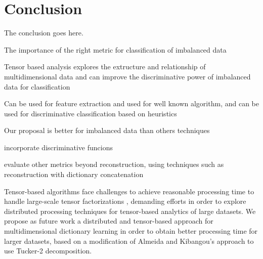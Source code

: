 
\section{Conclusion}
\label{sec:4_conclusion}

The conclusion goes here.

The importance of the right metric for classification of imbalanced data

Tensor based analysis explores the extructure and relationship of multidimensional data and can improve the discriminative power of imbalanced data for classification

Can be used for feature extraction and used for well known algorithm, and can be used for discriminative classification based on heuristics

Our proposal is better for imbalanced data than others techniques

incorporate discriminative funcions

evaluate other metrics beyond reconstruction, using techniques such as reconstruction with dictionary concatenation

Tensor-based algorithms face challenges to achieve reasonable processing time to handle large-scale tensor factorizations \cite{de2014distributed}, demanding efforts in order to explore distributed processing techniques for tensor-based analytics of large datasets. We propose as future work a distributed and tensor-based approach for multidimensional dictionary learning in order to obtain better processing time for larger datasets, based on a modification of Almeida and Kibangou's \cite{de2014distributed} approach to use Tucker-2 decomposition.